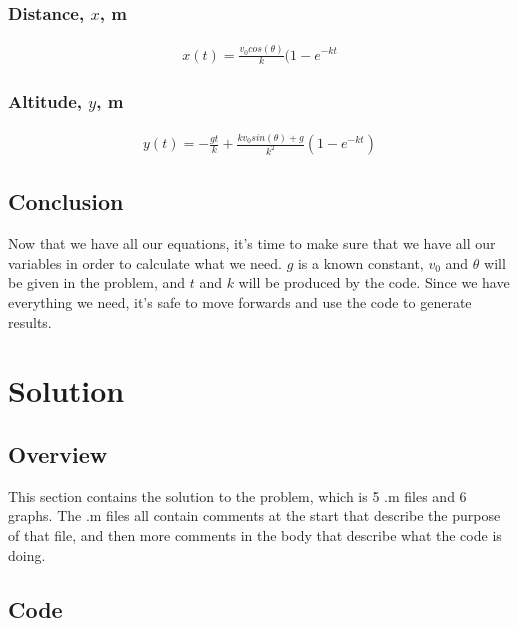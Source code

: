 \documentclass[oneside]{article}
\begin{document}
\subsubsection{Distance, $x$, m}
    \begin{align}
        x(t) = \frac{v_0cos(\theta)}{k}(1-e^{-kt}
    \end{align}
\subsubsection{Altitude, $y$, m}
    \begin{align}
        y(t) = -\frac{gt}{k} + \frac{kv_0sin(\theta) + g}{k^2}(1-e^{-kt})
    \end{align}
\subsection{Conclusion}
Now that we have all our equations, it's time to make sure that we have all our variables in order to calculate what we need. $g$ is a known constant, $v_0$ and $\theta$ will be given in the problem, and $t$ and $k$ will be produced by the code. Since we have everything we need, it's safe to move forwards and use the code to generate results.\\

\clearpage

\section{Solution}
\subsection{Overview}
This section contains the solution to the problem, which is 5 .m files and 6 graphs. The .m files all contain comments at the start that describe the purpose of that file, and then more comments in the body that describe what the code is doing. 
\subsection{Code}
\end{document}
